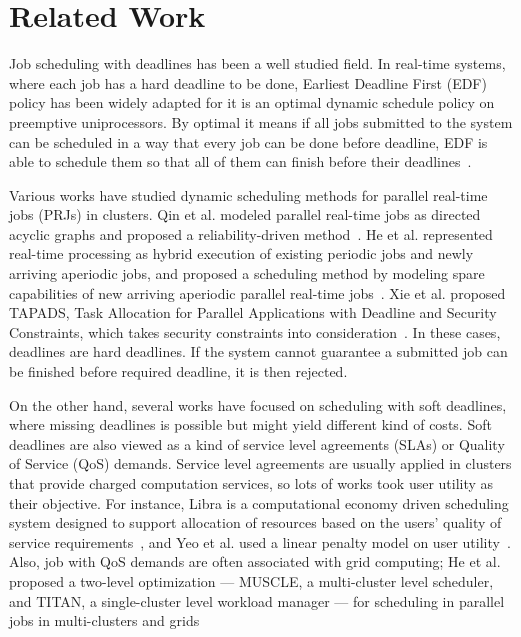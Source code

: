 \chapter{Related Work}\label{sec:related}

Job scheduling with deadlines has been a well studied field.
In real-time systems, where each job has a hard deadline to be done,
Earliest Deadline First (EDF) policy has been widely adapted for it is
an optimal dynamic schedule policy on preemptive
uniprocessors.
By optimal it means if all jobs submitted to the system can be scheduled
in a way that every job can be done before deadline, EDF is able to
schedule them so that all of them can finish before their
deadlines~\cite{cite:pinedo2012scheduling}.

Various works have studied dynamic scheduling methods for parallel
real-time jobs (PRJs) in clusters.
Qin et al. modeled parallel real-time jobs as directed acyclic graphs
and proposed a reliability-driven
method~\cite{cite:qin-reliability-driven}.
He et al. represented real-time processing as hybrid execution of
existing periodic jobs and newly arriving aperiodic jobs, and proposed a
scheduling method by modeling spare capabilities of new arriving
aperiodic parallel real-time jobs~\cite{cite:he-spare-capabilities}.
Xie et al. proposed TAPADS, Task Allocation for Parallel Applications
with Deadline and Security Constraints, which takes security constraints
into consideration~\cite{cite:xie-TAPADS,cite:xie2008security}.
In these cases, deadlines are hard deadlines.
If the system cannot guarantee a submitted job can be finished before
required deadline, it is then rejected.

On the other hand, several works have focused on scheduling with soft
deadlines, where missing deadlines is possible but might yield different
kind of costs.
Soft deadlines are also viewed as a kind of service level agreements
(SLAs) or Quality of Service (QoS) demands.
Service level agreements are usually applied in clusters that provide
charged computation services, so lots of works took user utility as
their objective.
For instance, Libra is a computational economy driven scheduling system
designed to support allocation of resources based on the users' quality
of service requirements~\cite{cite:libra}, and Yeo et al. used a linear
penalty model on user utility~\cite{cite:yeo-SLA-penalty}.
Also, job with QoS demands are often associated with grid computing; He
et al. proposed a two-level optimization --- MUSCLE, a multi-cluster
level scheduler, and TITAN, a single-cluster level workload manager ---
for scheduling in parallel jobs in multi-clusters and
grids~\cite{cite:he-muscle-titan}

